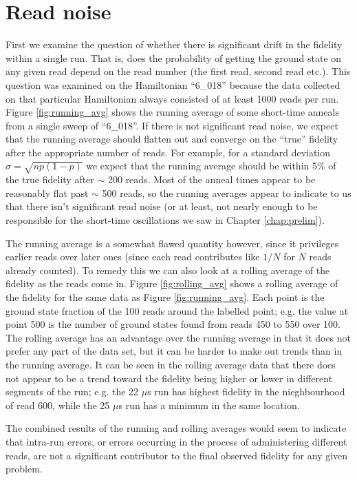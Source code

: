 \section{Read noise}
First we examine the question of whether there is significant drift in the fidelity within a single run.  That is, does the probability of getting the ground state on any given read depend on the read number (the first read, second read etc.).  This question was examined on the Hamiltonian ``6\_018'' because the data collected on that particular Hamiltonian always consisted of at least 1000 reads per run.
Figure \ref{fig:running_avg} shows the running average of some short-time anneals from a single sweep of ``6\_018''.  If there is not significant read noise, we expect that the running average should flatten out and converge on the ``true'' fidelity after the appropriate number of reads.  For example, for a standard deviation $\sigma = \sqrt{np(1-p)}$ we expect that the running average should be within 5\% of the true fidelity after $\sim$ 200 reads.  Most of the anneal times appear to be reasonably flat past $\sim$ 500 reads, so the running averages appear to indicate to us that there isn't significant read noise (or at least, not nearly enough to be responsible for the short-time oscillations we saw in Chapter \ref{chap:prelim}).

The running average is a somewhat flawed quantity however, since it privileges earlier reads over later ones (since each read contributes like $1/N$ for $N$ reads already counted).  To remedy this we can also look at a rolling average of the fidelity as the reads come in.  Figure \ref{fig:rolling_avg} shows a rolling average of the fidelity for the same data as Figure \ref{fig:running_avg}.  Each point is the ground state fraction of the 100 reads around the labelled point; e.g. the value at point 500 is the number of ground states found from reads 450 to 550 over 100.  The rolling average has an advantage over the running average in that it does not prefer any part of the data set, but it can be harder to make out trends than in the running average.  It can be seen in the rolling average data that there does not appear to be a trend toward the fidelity being higher or lower in different segments of the run; e.g. the 22 $\mu$s run has highest fidelity in the nieghbourhood of read 600, while the 25 $\mu$s run has a minimum in the same location.

The combined results of the running and rolling averages would seem to indicate that intra-run errors, or errors occurring in the process of administering different reads, are not a significant contributor to the final observed fidelity for any given problem.

